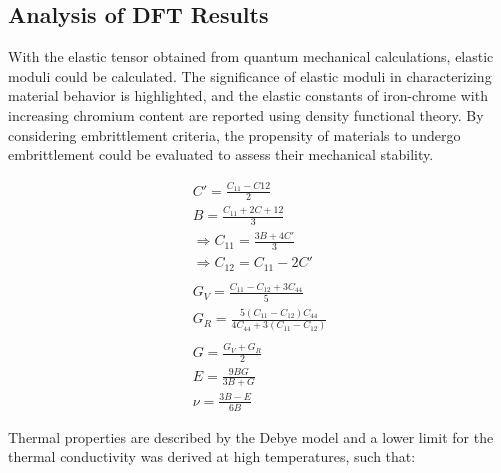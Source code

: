 \subsection{Analysis of DFT Results}
With the elastic tensor obtained from quantum mechanical calculations, elastic moduli could be calculated. The significance of elastic moduli in characterizing material behavior is highlighted, and the elastic constants of iron-chrome with increasing chromium content are reported using density functional theory. By considering embrittlement criteria, the propensity of materials to undergo embrittlement could be evaluated to assess their mechanical stability.

\begin{eqnarray}
    C' = \frac{C_{11}-C{12}}{2} \\
    B = \frac{C_{11} + 2C+{12}}{3} \\
    \Rightarrow C_{11}= \frac{3B+4C'}{3} \\
    \Rightarrow C_{12} = C_{11} - 2 C' \\ \\
    G_V = \frac{C_{11}-C_{12} + 3C_{44}}{5} \\
    G_R = \frac{5(C_{11}-C_{12})C_{44}}{4C_{44}+3(C_{11}-C_{12})} \\ \\
    G = \frac{G_V + G_R}{2} \\
    E = \frac{9BG}{3B+G} \\
    \nu = \frac{3B-E}{6B}
\end{eqnarray}

Thermal properties are described by the Debye model and a lower limit for the thermal conductivity was derived at high temperatures, such that: \cite{clarke2003materialsselection,clarke2003materialsdesign}

